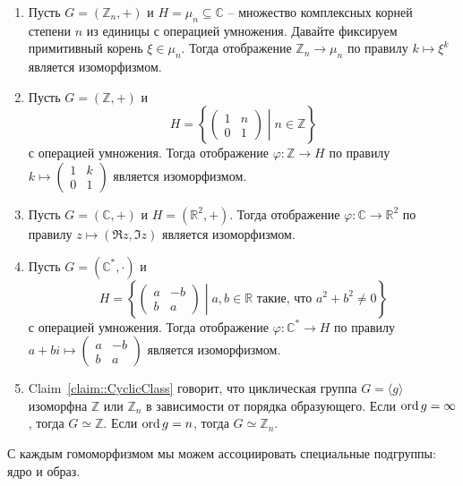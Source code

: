 \begin{examples}
\begin{enumerate}
\item Пусть $G = (\mathbb Z_n, +)$ и $H = \mu_n\subseteq \mathbb C$ -- множество комплексных корней степени $n$ из единицы с операцией умножения.
Давайте фиксируем примитивный корень $\xi \in\mu_n$.
Тогда отображение $\mathbb Z_n \to \mu_n$ по правилу $k \mapsto \xi^k$ является изоморфизмом.

\item Пусть $G = (\mathbb Z, +)$ и
\[
H = \left\{\left.
\begin{pmatrix}
{1}&{n}\\
{0}&{1}
\end{pmatrix}
\;\right|\;
n\in \mathbb Z
\right\}
\]
с операцией умножения.
Тогда отображение $\varphi\colon \mathbb Z\to H$ по правилу $k \mapsto \left(\begin{smallmatrix}{1}&{k}\\{0}&{1}\end{smallmatrix}\right)$ является изоморфизмом.

\item Пусть $G = (\mathbb C, +)$ и $H = (\mathbb R^2, +)$.
Тогда отображение $\varphi \colon \mathbb C\to \mathbb R^2$ по правилу $z \mapsto (\Re z, \Im z)$ является изоморфизмом.

\item Пусть $G = (\mathbb C^*, \cdot)$ и
\[
H = \left\{\left.
\begin{pmatrix}
{a}&{-b}\\
{b}&{a}
\end{pmatrix}
\;\right|\;
a, b\in \mathbb R\text{ такие, что }a^2 + b^2 \neq 0
\right\}
\]
с операцией умножения.
Тогда отображение $\varphi \colon \mathbb C^*\to H$ по правилу $a + bi \mapsto \left(\begin{smallmatrix}{a}&{-b}\\{b}&{a}\end{smallmatrix}\right)$ является изоморфизмом.

\item Claim~\ref{claim::CyclicClass} говорит, что циклическая группа $G = \langle g \rangle$ изоморфна $\mathbb Z$ или $\mathbb Z_n$ в зависимости от порядка образующего.
Если $\operatorname{ord} g = \infty$, тогда $G\simeq \mathbb Z$.
Если $\operatorname{ord} g = n$, тогда $G\simeq \mathbb Z_n$.
\end{enumerate}
\end{examples}

С каждым гомоморфизмом мы можем ассоциировать специальные подгруппы: ядро и образ.

